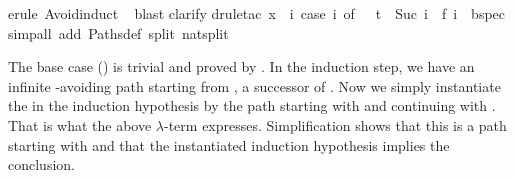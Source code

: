 \begin{isabellebody}
%
\isadelimproof
%
\endisadelimproof
%
\isatagproof
\isamarkupfalse%
erule\ Avoid{\isachardot}induct{\isacharparenright}\isanewline
\ \isamarkupfalse%
blast{\isacharparenright}\isanewline
\isamarkupfalse%
clarify{\isacharparenright}\isanewline
\isamarkupfalse%
drule{\isacharunderscore}tac\ x\ {\isacharequal}\ {\isachardoublequote}{\isasymlambda}i{\isachardot}\ case\ i\ of\ {}\ {\isasymRightarrow}\ t\ {\isacharbar}\ Suc\ i\ {\isasymRightarrow}\ f\ i{\isachardoublequote}\ \ bspec{\isacharparenright}\isanewline
\isamarkupfalse%
simp{\isacharunderscore}all\ add{\isacharcolon}\ Paths{\isacharunderscore}def\ split{\isacharcolon}\ nat{\isachardot}split{\isacharparenright}\isanewline
\isamarkupfalse%
%
\endisatagproof
{\isafoldproof}%
%
\isadelimproof
%
\endisadelimproof
\isamarkuptrue%
%
\begin{isamarkuptext}%
\noindent
The base case () is trivial and proved by .
In the induction step, we have an infinite -avoiding path 
starting from , a successor of . Now we simply instantiate
the  in the induction hypothesis by the path starting with
 and continuing with . That is what the above $\lambda$-term
expresses.  Simplification shows that this is a path starting with  
and that the instantiated induction hypothesis implies the conclusion.


\end{isamarkuptext}
\end{isabellebody}
